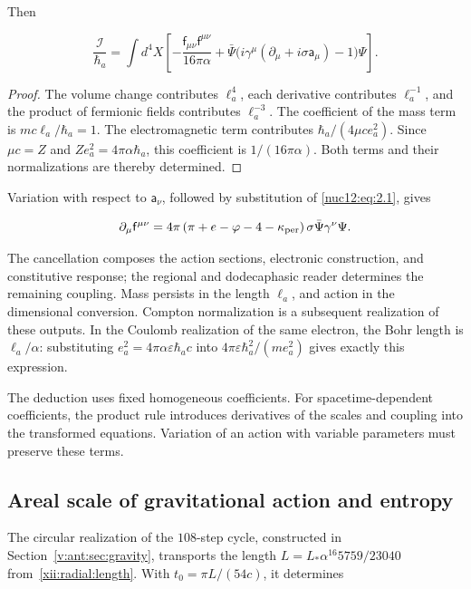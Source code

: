 Then

\begin{equation}
\boxed{\frac{\mathcal I}{\hbar_a}=
\int d^4X\left[
-\frac{\mathsf f_{\mu\nu}\mathsf f^{\mu\nu}}{16\pi\alpha}
+\bar\Psi\bigl(i\gamma^\mu(\partial_\mu+i\sigma\mathsf a_\mu)-1\bigr)\Psi
\right].}
\label{nuc12:eq:3.3}
\end{equation}

\begin{proof}
The volume change contributes \(\ell_a^4\), each derivative contributes \(\ell_a^{-1}\), and the product of fermionic fields contributes \(\ell_a^{-3}\). The coefficient of the mass term is \(mc\ell_a/\hbar_a=1\). The electromagnetic term contributes \(\hbar_a/(4\mu c e_a^2)\). Since \(\mu c=Z\) and \(Ze_a^2=4\pi\alpha\hbar_a\), this coefficient is \(1/(16\pi\alpha)\). Both terms and their normalizations are thereby determined.
\end{proof}

Variation with respect to \(\mathsf a_\nu\), followed by substitution of \eqref{nuc12:eq:2.1}, gives

\begin{equation}
\partial_\mu\mathsf f^{\mu\nu}
=4\pi\left(\pi+e-\varphi-4-\kappa_{\rm per}\right)
\sigma\bar\Psi\gamma^\nu\Psi .
\label{nuc12:eq:3.4}
\end{equation}

The cancellation composes the action sections, electronic construction, and constitutive response; the regional and dodecaphasic reader determines the remaining coupling. Mass persists in the length \(\ell_a\), and action in the dimensional conversion. Compton normalization is a subsequent realization of these outputs. In the Coulomb realization of the same electron, the Bohr length is \(\ell_a/\alpha\): substituting \(e_a^2=4\pi\alpha\varepsilon\hbar_a c\) into \(4\pi\varepsilon\hbar_a^2/(m e_a^2)\) gives exactly this expression.

The deduction uses fixed homogeneous coefficients. For spacetime-dependent coefficients, the product rule introduces derivatives of the scales and coupling into the transformed equations. Variation of an action with variable parameters must preserve these terms.

\subsection{Areal scale of gravitational action and entropy}

The circular realization of the \(108\)-step cycle, constructed in Section~\ref{v:ant:sec:gravity}, transports the length \(L=L_*\alpha^{16}5759/23040\) from~\eqref{xii:radial:length}. With \(t_0=\pi L/(54c)\), it determines

